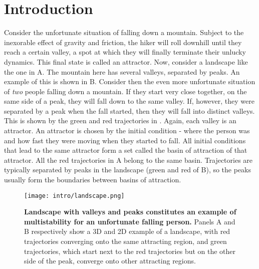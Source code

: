 \chapter{Introduction}
Consider the unfortunate situation of falling down a mountain. Subject to the inexorable effect of gravity and friction, the hiker will roll downhill until they reach a certain valley, a spot at which they will finally terminate their unlucky dynamics. This final state is called an attractor. Now, consider a landscape like the one in A. The mountain here has several valleys, separated by peaks. An example of this is shown in B. Consider then the even more unfortunate situation of \textit{two} people falling down a mountain. If they start very close together, on the same side of a peak, they will fall down to the same valley. If, however, they were separated by a peak when the fall started, then they will fall into distinct valleys. This is shown by the green and red trajectories in . Again, each valley is an attractor. An attractor is chosen by the initial condition - where the person was and how fast they were moving when they started to fall. All initial conditions that lead to the same attractor form a set called the basin of attraction of that attractor. All the red trajectories in A belong to the same basin. Trajectories are typically separated by peaks in the landscape (green and red of B), so the peaks usually form the boundaries between basins of attraction.
%
\begin{figure}[htb!]
    \centering
    \texttt{[image: intro/landscape.png]}
    \caption{\textbf{Landscape with valleys and peaks constitutes an example of multistability for an unfortunate falling person.} Panels A and B respectively show a 3D and 2D example of a landscape, with red trajectories converging onto the same attracting region, and green trajectories, which start next to the red trajectories but on the other side of the peak, converge onto other attracting regions.}
    \label{fig:intro:landscape}
\end{figure}



